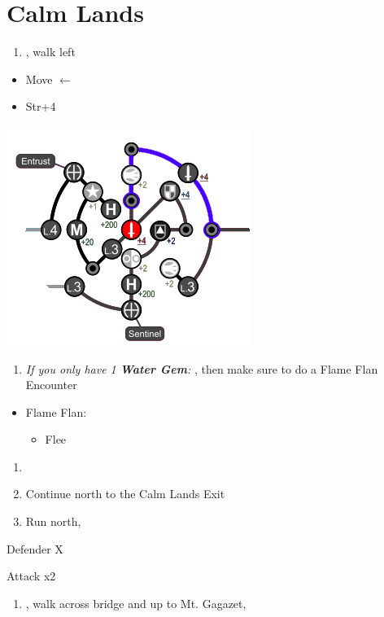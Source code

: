 \chapter{Calm Lands}

\begin{enumerate}
	\item \sd, walk left
\end{enumerate}
\begin{spheregrid}
	\begin{itemize}
		\yunaf
		\begin{itemize}
			\item Move $\leftarrow$
			\item Str+4
		\end{itemize}
		\includegraphics[width=.5\columnwidth]{graphics/yuna_blitz_win_highbridge_2}
	\end{itemize}
\end{spheregrid}
\begin{enumerate}[resume]
	\item \textit{If you only have 1 \textbf{Water Gem}:} \formation{\tidus}{\auron}{\yuna}, then make sure to do a Flame Flan Encounter
\end{enumerate}
\begin{encounters}
	\begin{itemize}
		\item Flame Flan:
		      \begin{itemize}
			      \kimahrif Steal
			      \item Flee
		      \end{itemize}
	\end{itemize}
\end{encounters}
\begin{enumerate}[resume]
	\item \formation{\tidus}{\kimahri}{\auron}
	\item Continue north to the Calm Lands Exit
	\item Run north, \sd
\end{enumerate}
\begin{battle}[64000]{Defender X}
	\begin{itemize}
		\switch{\tidus}{\yuna}
		\summon{\bahamut}
		\bahamutf Attack x2
	\end{itemize}
\end{battle}
\begin{enumerate}[resume]
	\item \sd, walk across bridge and up to Mt. Gagazet, \sd
\end{enumerate}
